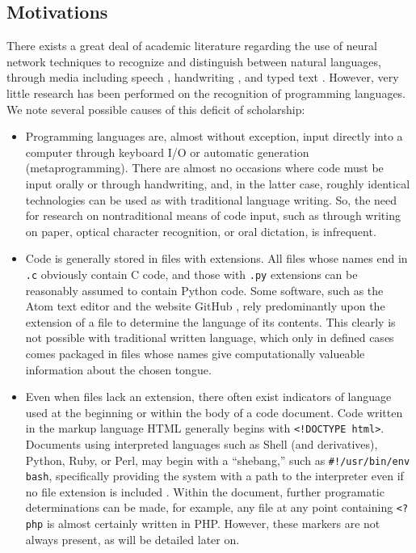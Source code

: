 \documentclass{article}
\begin{document}
\subsection{Motivations}
There exists a great deal of academic literature regarding the use of neural network techniques to recognize and distinguish between natural languages, through media including speech \cite{rnnspoken}\cite{dcrnnspoken}, handwriting \cite{handwritingex}, and typed text \cite{langidnn}\cite{langidstanford}. However, very little research has been performed on the recognition of programming languages. We note several possible causes of this deficit of scholarship:
\begin{itemize}
    \item{Programming languages are, almost without exception, input directly into a computer through keyboard I/O or automatic generation (metaprogramming). There are almost no occasions where code must be input orally or through handwriting, and, in the latter case, roughly identical technologies can be used as with traditional language writing. So, the need for research on nontraditional means of code input, such as through writing on paper, optical character recognition, or oral dictation, is infrequent.}
    \item{Code is generally stored in files with extensions. All files whose names end in \texttt{.c} obviously contain C code, and those with \texttt{.py} extensions can be reasonably assumed to contain Python code. Some software, such as the Atom text editor and the website GitHub \cite{githubid}, rely predominantly upon the extension of a file to determine the language of its contents. This clearly is not possible with traditional written language, which only in defined cases comes packaged in files whose names give computationally valueable information about the chosen tongue.}
    \item{Even when files lack an extension, there often exist indicators of language used at the beginning or within the body of a code document. Code written in the markup language \cite{htmlnotproglang} HTML generally begins with \texttt{<!DOCTYPE html>}. Documents using interpreted languages such as Shell (and derivatives), Python, Ruby, or Perl, may begin with a ``shebang,'' such as \texttt{#!/usr/bin/env bash}, specifically providing the system with a path to the interpreter even if no file extension is included \cite{shebang}. Within the document, further programatic determinations can be made, for example, any file at any point containing \texttt{<?php} is almost certainly written in PHP. However, these markers are not always present, as will be detailed later on.}
\end{itemize}
\end{document}
